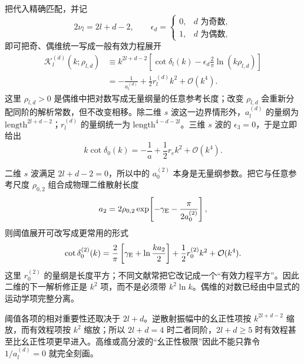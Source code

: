 把代入精确匹配，并记
\[
2\nu_l=2l+d-2,
\qquad
\epsilon_d=
\begin{cases}
0,&d\text{ 为奇数},\\
1,&d\text{ 为偶数},
\end{cases}
\]
即可把奇、偶维统一写成一般有效力程展开
\begin{equation}
\begin{aligned}
\mathcal K_l^{(d)}(k;\rho_{l,d})
&\equiv
k^{2l+d-2}
\left[
\cot\delta_l(k)
-\epsilon_d\frac2\pi\ln(k\rho_{l,d})
\right]\\
&=-\frac1{a_l^{(d)}}
+\frac12r_l^{(d)}k^2
+\mathcal O(k^4).
\end{aligned}
\label{eq:phys-hdqm-ere-general-d}
\end{equation}
这里 $\rho_{l,d}>0$ 是偶维中把对数写成无量纲量的任意参考长度；改变 $\rho_{l,d}$ 会重新分配同阶的解析常数，但不改变相移。除二维 $s$ 波这一边界情形外，$a_l^{(d)}$ 的量纲为 $\mathrm{length}^{2l+d-2}$；$r_l^{(d)}$ 的量纲统一为 $\mathrm{length}^{4-d-2l}$。三维 $s$ 波的 $\epsilon_3=0$，于是立即给出
\begin{equation}
k\cot\delta_0(k)=-\frac1a+\frac12r_e k^2+\mathcal O(k^4).
\label{eq:phys-hdqm-ere-3d}
\end{equation}

二维 $s$ 波满足 $2l+d-2=0$，所以中的 $a_0^{(2)}$ 本身是无量纲参数。把它与任意参考尺度 $\rho_{0,2}$ 组合成物理二维散射长度
\[
a_2
=2\rho_{0,2}
\exp\!\left[-\gamma_{\rm E}-\frac{\pi}{2a_0^{(2)}}\right],
\]
则阈值展开可改写成更常用的形式
\begin{equation}
\cot\delta_0^{(2)}(k)
=\frac2\pi\left[\gamma_{\rm E}+\ln\frac{ka_2}{2}\right]
+\frac12r_0^{(2)}k^2
+\mathcal O(k^4).
\label{eq:phys-hdqm-ere-2d}
\end{equation}
这里 $r_0^{(2)}$ 的量纲是长度平方；不同文献常把它改记成一个“有效力程平方”。因此二维的下一解析修正是 $k^2$ 项，而不是必须带 $k^2\ln k$。偶维的对数已经由中显式的运动学项完整分离。

阈值各项的相对重要性还取决于 $2l+d$。逆散射振幅中的幺正性项按 $k^{2l+d-2}$ 缩放，而有效程项按 $k^2$ 缩放；所以 $2l+d=4$ 时二者同阶，$2l+d\ge5$ 时有效程甚至比幺正性项更早进入。高维或高分波的“幺正性极限”因此不能只靠令 $1/a_l^{(d)}=0$ 就完全刻画。

